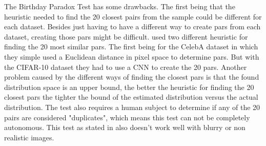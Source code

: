 The Birthday Paradox Test has some drawbacks.
The first being that the heuristic needed to find the 20 closest pairs from the sample could be different for each dataset.
Besides just having to have a different way to create pars from each dataset, creating those pars might be difficult.
\cite{arora2018gans} used two different heuristic for finding the 20 most similar pars.
The first being for the CelebA dataset in which they simple used a Euclidean distance in pixel space to determine pars.
But with the CIFAR-10 dataset they had to use a CNN to create the 20 pars.
Another problem caused by the different ways of finding the closest pars is that the found distribution space is an upper bound, the better the heuristic for finding the 20 closest pars the tighter the bound of the estimated distribution versus the actual distribution.
The test also requires a human subject to determine if any of the 20 pairs are considered "duplicates", which means this test can not be completely autonomous. This test as stated in \cite{arora2018gans} also doesn't work well with blurry or non realistic images. 